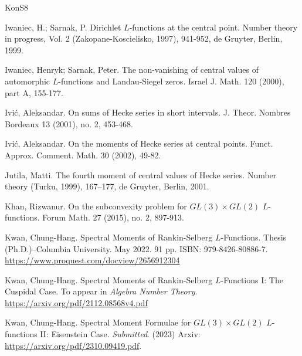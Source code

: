 \documentclass[11pt,reqno]{amsart}
\theoremstyle{definition}
\theoremstyle{definition}
\theoremstyle{remark}
\numberwithin{equation}{section}
\begin{document}
\begin{thebibliography}{KonS8}
	
	Iwaniec, H.; Sarnak, P. Dirichlet $L$-functions at the central point. Number theory in progress, Vol. 2 (Zakopane-Koscielisko, 1997), 941-952, de Gruyter, Berlin, 1999.

	Iwaniec, Henryk; Sarnak, Peter. The non-vanishing of central values of automorphic $L$-functions and Landau-Siegel zeros. Israel J. Math. 120 (2000), part A, 155-177.
	

	 
	 Ivi\'c, Aleksandar.  On sums of Hecke series in short intervals. J. Theor. Nombres Bordeaux 13 (2001), no. 2, 453-468.
	 
	Ivi\'c, Aleksandar. On the moments of Hecke series at central points. Funct. Approx. Comment. Math. 30 (2002), 49-82.
	
	  Jutila, Matti. The fourth moment of central values of Hecke series. Number theory (Turku, 1999), 167–177, de Gruyter, Berlin, 2001. 
	  



	
	
	




Khan, Rizwanur. On the subconvexity problem for $GL(3)\times GL(2)$ $L$-functions. Forum Math. 27 (2015), no. 2, 897-913.





 Kwan, Chung-Hang. Spectral Moments of Rankin-Selberg $L$-Functions. Thesis (Ph.D.)–Columbia University. May 2022. 91 pp. ISBN: 979-8426-80886-7. \url{https://www.proquest.com/docview/2656912304}
 
 Kwan, Chung-Hang.  Spectral Moments of Rankin-Selberg $L$-Functions I: The Cuspidal Case.  To appear in \textit{Algebra  Number Theory}.  \url{https://arxiv.org/pdf/2112.08568v4.pdf}
 
 Kwan, Chung-Hang.	Spectral Moment Formulae for $GL(3)\times GL(2)$ $L$-functions II:  Eisenstein  Case.   \textit{Submitted}. (2023) Arxiv:  \url{https://arxiv.org/pdf/2310.09419.pdf}. 
 




\end{thebibliography}
\end{document}
